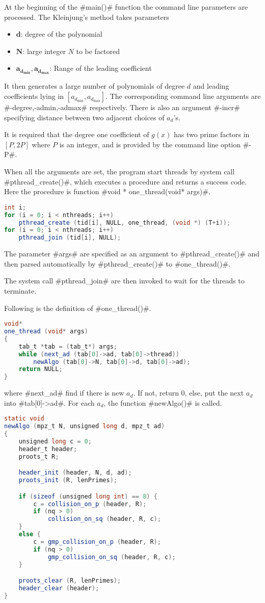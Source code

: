\documentclass[a4paper]{article}
\begin{document}
At the beginning of the #main()# function the command line parameters are processed.
The Kleinjung's method takes parameters
\begin{itemize}
  \item $\bm{d}$: degree of the polynomial
  \item $\bm{N}$: large integer $N$ to be factored
  \item $\bm{a_{d_{\min}}},\bm{a_{d_{\max}}}$: Range of the leading coefficient
\end{itemize}

It then generates a large number of polynomials of degree $d$ and leading coefficients lying in $[a_{d_{\min}},a_{d_{\max}}]$.
The corresponding command line arguments are #-degree,-admin,-admax# respectively.
There is also an argument #-incr# specifying distance between two adjacent choices of $a_d$'s.

It is required that the degree one coefficient of $g(x)$ has two prime factors in $[P,2P]$ where $P$ is an integer,
and is provided by the command line option #-P#.

When all the arguments are set, the program start threads by system call #pthread_create()#,
which executes a procedure and returns a success code.
Here the procedure is function #void * one_thread(void* args)#.
\begin{lstlisting}[language=Java]
int i;
for (i = 0; i < nthreads; i++)
    pthread_create (tid[i], NULL, one_thread, (void *) (T+i));
for (i = 0; i < nthreads; i++)
    pthread_join (tid[i], NULL);
\end{lstlisting}
The parameter #args# are specified as an argument to #pthread_create()#
and then parsed automatically by #pthread_create()# to #one_thread()#.

The system call #pthread_join# are then invoked to wait for the threads to terminate.

Following is the definition of #one_thread()#.
\begin{lstlisting}[language=Java]
void*
one_thread (void* args)
{
    tab_t *tab = (tab_t*) args;
    while (next_ad (tab[0]->ad, tab[0]->thread))
        newAlgo (tab[0]->N, tab[0]->d, tab[0]->ad);
    return NULL;
}
\end{lstlisting}
where #next_ad# find if there is new $a_d$.
If not, return 0, else, put the next $a_d$ into #tab[0]->ad#.
For each $a_d$, the function #newAlgo()# is called.
\begin{lstlisting}[language=Java]
static void
newAlgo (mpz_t N, unsigned long d, mpz_t ad)
{
    unsigned long c = 0;
    header_t header;
    proots_t R;

    header_init (header, N, d, ad);
    proots_init (R, lenPrimes);

    if (sizeof (unsigned long int) == 8) {
        c = collision_on_p (header, R);
        if (nq > 0)
            collision_on_sq (header, R, c);
    }
    else {
        c = gmp_collision_on_p (header, R);
        if (nq > 0)
            gmp_collision_on_sq (header, R, c);
    }

    proots_clear (R, lenPrimes);
    header_clear (header);
}
\end{lstlisting}
\end{document}
